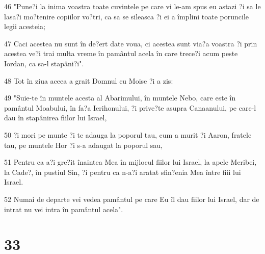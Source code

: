 \par 46 "Pune?i la inima voastra toate cuvintele pe care vi le-am spus eu astazi ?i sa le lasa?i mo?tenire copiilor vo?tri, ca sa se sileasca ?i ei a împlini toate poruncile legii acesteia;
\par 47 Caci acestea nu sunt în de?ert date voua, ci acestea sunt via?a voastra ?i prin acestea ve?i trai multa vreme în pamântul acela în care trece?i acum peste Iordan, ca sa-l stapâni?i".
\par 48 Tot în ziua aceea a grait Domnul cu Moise ?i a zis:
\par 49 "Suie-te în muntele acesta al Abarimului, în muntele Nebo, care este în pamântul Moabului, în fa?a Ierihonului, ?i prive?te asupra Canaanului, pe care-l dau în stapânirea fiilor lui Israel,
\par 50 ?i mori pe munte ?i te adauga la poporul tau, cum a murit ?i Aaron, fratele tau, pe muntele Hor ?i s-a adaugat la poporul sau,
\par 51 Pentru ca a?i gre?it înaintea Mea în mijlocul fiilor lui Israel, la apele Meribei, la Cade?, în pustiul Sin, ?i pentru ca n-a?i aratat sfin?enia Mea între fiii lui Israel.
\par 52 Numai de departe vei vedea pamântul pe care Eu îl dau fiilor lui Israel, dar de intrat nu vei intra în pamântul acela".

\chapter{33}

